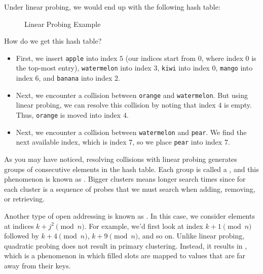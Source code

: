 Under linear probing, we would end up with the following hash table:

\begin{figure}[h]
\centering
{}
\caption{Linear Probing Example}
\end{figure}

How do we get this hash table? 
\begin{itemize}
    \item First, we insert \verb!apple! into index $5$ (our indices start from $0$, where index $0$ is the top-most entry), \verb!watermelon! into index $3$, \verb!kiwi! into index $0$, \verb!mango! into index $6$, and \verb!banana! into index $2$. 
    \item Next, we encounter a collision between \verb!orange! and \verb!watermelon!. But using linear probing, we can resolve this collision by noting that index $4$ is empty. Thus, \verb!orange! is moved into index $4$.
    \item Next, we encounter a collision between \verb!watermelon! and \verb!pear!. We find the next available index, which is index $7$, so we place \verb!pear! into index $7$. 
\end{itemize}

As you may have noticed, resolving collisions with linear probing generates groups of consecutive elements in the hash table. Each group is called a , and this phenomenon is known as . Bigger clusters means longer search times since for each cluster is a sequence of probes that we must search when adding, removing, or retrieving.


Another type of open addressing is known as . In this case, we consider elements at indices $k + j^{2} \pmod{n}$. For example, we'd first look at index $k + 1 \pmod{n}$ followed by $k + 4 \pmod{n}$, $k + 9 \pmod{n}$, and so on. Unlike linear probing, quadratic probing does not result in primary clustering. Instead, it results in , which is a phenomenon in which filled slots are mapped to values that are far away from their keys. \\

